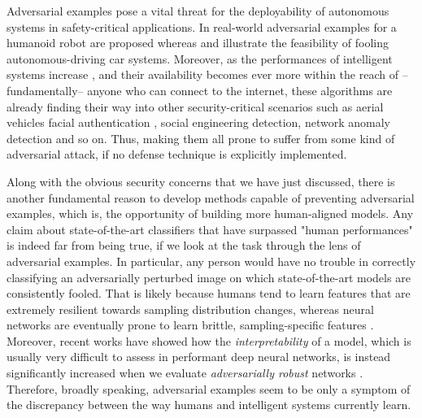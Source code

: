 \documentclass[LaM,binding=0.6cm]{./packages/sapthesis/sapthesis}
\begin{document}
        Adversarial examples pose a vital threat for the deployability of autonomous systems in safety-critical applications. In \cite{iCub} real-world adversarial examples for 
        a humanoid robot are proposed whereas \cite{darts} and \cite{autonomous_adv} illustrate the feasibility of fooling autonomous-driving car systems.
        Moreover, as the performances of intelligent systems increase \cite{residual_nets} \cite{inception}, and their availability becomes ever more within the reach of --fundamentally-- anyone who can connect to the internet, these algorithms 
        are already finding their way into other security-critical scenarios such as aerial vehicles facial authentication \cite{aerialveichles}, social engineering detection, network anomaly detection \cite{socialeng_adv} \cite{anomalydet_adv} and so on. 
        Thus, making them all prone to suffer from some kind of adversarial attack, if no defense technique is explicitly implemented.
        
        Along with the obvious security concerns that we have just discussed, there is another fundamental reason to develop methods capable of preventing adversarial examples, which is, the opportunity of 
        building more human-aligned models. Any claim about state-of-the-art classifiers that have surpassed "human performances" is indeed far from being true, if we look at the task through the lens of adversarial examples.
        In particular, any person would have no trouble in correctly classifying an adversarially perturbed image on which state-of-the-art models are consistently fooled. That is likely because humans tend to learn features that are 
        extremely resilient towards sampling distribution changes, whereas neural networks are eventually prone to learn brittle, sampling-specific features \cite{features_notbugs}.
        Moreover, recent works have showed how the \textit{interpretability} of a model, which is usually very difficult to assess in performant deep neural networks, is instead significantly increased 
        when we evaluate \textit{adversarially robust} networks \cite{robustness_accuracy} \cite{interpret_adv}. Therefore, broadly speaking, adversarial examples 
        seem to be only a symptom of the discrepancy between the way humans and intelligent systems currently learn.
\end{document}
